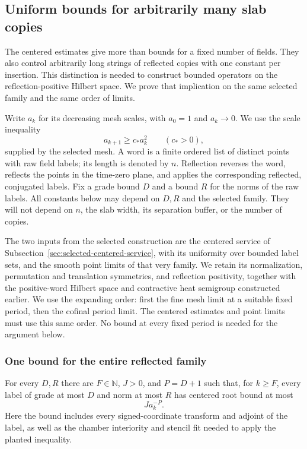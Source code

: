 \subsection{Uniform bounds for arbitrarily many slab copies}
\label{sec:actual-slab-copy-bounds}

The centered estimates give more than bounds for a fixed number of fields.
They also control arbitrarily long strings of reflected copies with one
constant per insertion. This distinction is needed to construct bounded
operators on the reflection-positive Hilbert space. We prove that implication
on the same selected family and the same order of limits.

Write $a_k$ for its decreasing mesh scales, with $a_0=1$ and $a_k\to0$.
We use the scale inequality
\begin{equation}\label{eq:slab-mesh-gentle}
 a_{k+1}\geq c_*a_k^2\qquad(c_*>0),
\end{equation}
supplied by the selected mesh. A word is a finite ordered list of distinct
points with raw field labels; its length is denoted by $n$. Reflection
reverses the word, reflects the points in the time-zero plane, and applies
the corresponding reflected, conjugated labels. Fix a grade bound $D$ and
a bound $R$ for the norms of the raw labels. All constants below may depend
on $D,R$ and the selected family. They will not depend on $n$, the slab
width, its separation buffer, or the number of copies.

The two inputs from the selected construction are the centered service of
Subsection~\ref{sec:selected-centered-service}, with its uniformity over
bounded label sets, and the smooth point limits of that very family. We
retain its normalization, permutation and translation symmetries, and
reflection positivity, together with the positive-word Hilbert space and
contractive heat semigroup constructed earlier. We use the expanding order: first the fine mesh limit at a suitable fixed
period, then the cofinal period limit. The centered estimates and point
limits must use this same order. No bound at every fixed period is needed
for the argument below.

\subsubsection{One bound for the entire reflected family}

For every $D,R$ there are $F\in\mathbb N$, $J>0$, and $P=D+1$ such that,
for $k\geq F$, every label of grade at most $D$ and norm at most $R$ has
centered root bound at most
\begin{equation}\label{eq:slab-one-price}
                         J a_k^{-P}.
\end{equation}
Here the bound includes every signed-coordinate transform and adjoint of
the label, as well as the chamber interiority and stencil fit needed to
apply the planted inequality.

